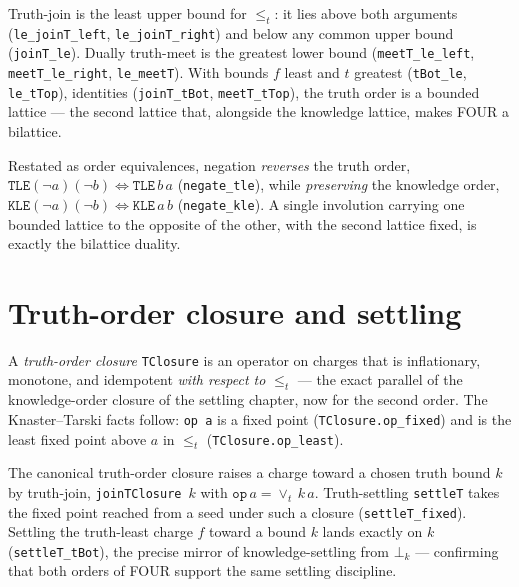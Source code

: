 \begin{theorem}\label{thm:truth-lattice}\leanok{}
  Truth-join is the least upper bound for $\le_t$: it lies above both arguments (\texttt{le\_joinT\_left}, \texttt{le\_joinT\_right}) and below any common upper bound (\texttt{joinT\_le}). Dually truth-meet is the greatest lower bound (\texttt{meetT\_le\_left}, \texttt{meetT\_le\_right}, \texttt{le\_meetT}). With bounds $f$ least and $t$ greatest (\texttt{tBot\_le}, \texttt{le\_tTop}), identities (\texttt{joinT\_tBot}, \texttt{meetT\_tTop}), the truth order is a bounded lattice --- the second lattice that, alongside the knowledge lattice, makes FOUR a bilattice.
\end{theorem}

\begin{theorem}\label{thm:negate-tle}\leanok{}
  Restated as order equivalences, negation \emph{reverses} the truth order, $\texttt{TLE}(\neg a)(\neg b) \iff \texttt{TLE}\,b\,a$ (\texttt{negate\_tle}), while \emph{preserving} the knowledge order, $\texttt{KLE}(\neg a)(\neg b) \iff \texttt{KLE}\,a\,b$ (\texttt{negate\_kle}). A single involution carrying one bounded lattice to the opposite of the other, with the second lattice fixed, is exactly the bilattice duality.
\end{theorem}

\section{Truth-order closure and settling}

\begin{definition}\label{def:tclosure}\leanok{}
  A \emph{truth-order closure} \texttt{TClosure} is an operator on charges that is inflationary, monotone, and idempotent \emph{with respect to} $\le_t$ --- the exact parallel of the knowledge-order closure of the settling chapter, now for the second order. The Knaster--Tarski facts follow: \texttt{op a} is a fixed point (\texttt{TClosure.op\_fixed}) and is the least fixed point above $a$ in $\le_t$ (\texttt{TClosure.op\_least}).
\end{definition}

\begin{definition}\label{def:settleT}\leanok{}
  The canonical truth-order closure raises a charge toward a chosen truth bound $k$ by truth-join, \texttt{joinTClosure}~$k$ with $\texttt{op}\,a = \vee_t\,k\,a$. Truth-settling \texttt{settleT} takes the fixed point reached from a seed under such a closure (\texttt{settleT\_fixed}). Settling the truth-least charge $f$ toward a bound $k$ lands exactly on $k$ (\texttt{settleT\_tBot}), the precise mirror of knowledge-settling from $\bot_k$ --- confirming that both orders of FOUR support the same settling discipline.
\end{definition}

